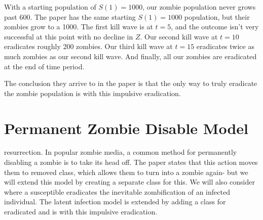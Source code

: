 \documentclass[]{article}
\begin{document}
\begin{figure}[H]
\end{figure}
With a starting population of $S(1) = 1000$, our zombie population never grows past 600.
The paper has the same starting $S(1) = 1000$ population, but their zombies grow to a
1000. The first kill wave is at $t = 5$, and the outcome isn’t very successful at this point
with no decline in $Z$. Our second kill wave at $t = 10$ eradicates roughly 200 zombies.
Our third kill wave at $t = 15$ eradicates twice as much zombies as our second kill wave.
And finally, all our zombies are eradicated at the end of time period.

The conclusion they arrive to in the paper is that the only way to truly eradicate the
zombie population is with this impulsive eradication.

\section{Permanent Zombie Disable Model}
resurrection. In popular zombie media, a common method for permanently disabling a
zombie is to take its head off. The paper states that this action moves them to removed
class, which allows them to turn into a zombie again- but we will extend this model by
creating a separate class for this. We will also consider where a susceptible eradicates
the inevitable zombification of an infected individual.
The latent infection model is extended by adding a class  for eradicated and
is with this impulsive eradication.
\end{document}
